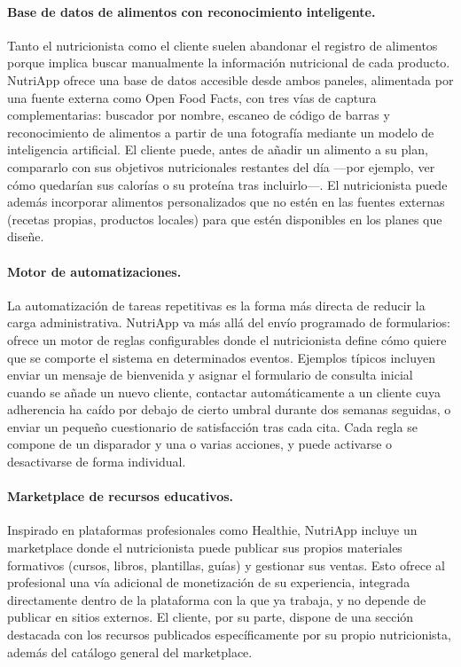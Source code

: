 \paragraph{Base de datos de alimentos con reconocimiento inteligente.}
Tanto el nutricionista como el cliente suelen abandonar el registro de alimentos porque implica buscar manualmente la información nutricional de cada producto. NutriApp ofrece una base de datos accesible desde ambos paneles, alimentada por una fuente externa como Open Food Facts, con tres vías de captura complementarias: buscador por nombre, escaneo de código de barras y reconocimiento de alimentos a partir de una fotografía mediante un modelo de inteligencia artificial. El cliente puede, antes de añadir un alimento a su plan, compararlo con sus objetivos nutricionales restantes del día ---por ejemplo, ver cómo quedarían sus calorías o su proteína tras incluirlo---. El nutricionista puede además incorporar alimentos personalizados que no estén en las fuentes externas (recetas propias, productos locales) para que estén disponibles en los planes que diseñe.

\paragraph{Motor de automatizaciones.}
La automatización de tareas repetitivas es la forma más directa de reducir la carga administrativa. NutriApp va más allá del envío programado de formularios: ofrece un motor de reglas configurables donde el nutricionista define cómo quiere que se comporte el sistema en determinados eventos. Ejemplos típicos incluyen enviar un mensaje de bienvenida y asignar el formulario de consulta inicial cuando se añade un nuevo cliente, contactar automáticamente a un cliente cuya adherencia ha caído por debajo de cierto umbral durante dos semanas seguidas, o enviar un pequeño cuestionario de satisfacción tras cada cita. Cada regla se compone de un disparador y una o varias acciones, y puede activarse o desactivarse de forma individual.

\paragraph{Marketplace de recursos educativos.}
Inspirado en plataformas profesionales como Healthie, NutriApp incluye un marketplace donde el nutricionista puede publicar sus propios materiales formativos (cursos, libros, plantillas, guías) y gestionar sus ventas. Esto ofrece al profesional una vía adicional de monetización de su experiencia, integrada directamente dentro de la plataforma con la que ya trabaja, y no depende de publicar en sitios externos. El cliente, por su parte, dispone de una sección destacada con los recursos publicados específicamente por su propio nutricionista, además del catálogo general del marketplace.

